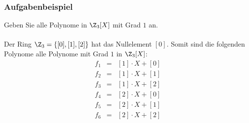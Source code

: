 %
%
\begin{frame}\frametitle{Aufgabenbeispiel}
Geben Sie alle Polynome in $\Z_3[X]$ mit Grad $1$ an. \\\pause\vfill
{}\\
Der Ring $\Z_3=\{[0],[1],[2]\}$ hat das Nullelement $[0]$.
Somit sind die folgenden Polynome alle Polynome mit Grad $1$ in $\Z_3[X]$:
\begin{eqnarray*}
	f_1	&=	& [1]\cdot X + [0]	\\
	f_2	&=	& [1]\cdot X + [1]	\\
	f_3	&=	& [1]\cdot X + [2]	\\
	f_4	&=	& [2]\cdot X + [0]	\\
	f_5	&=	& [2]\cdot X + [1]	\\
	f_6	&=	& [2]\cdot X + [2]	\\
\end{eqnarray*}
\end{frame}
%
